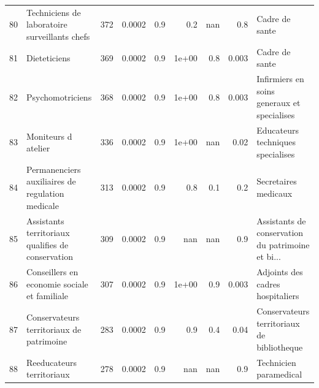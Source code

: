 \documentclass[11pt,a4paper]{article}
\begin{document}
\begin{tabular}{llrrrrrrl}
	80  &      Techniciens de laboratoire surveillants chefs &            372 &         0.0002 &                    0.9 &                0.2 &                               nan &                                      0.8 &                                     Cadre de sante \\
	81  &                                       Dieteticiens &            369 &         0.0002 &                    0.9 &              1e+00 &                               0.8 &                                    0.003 &                                     Cadre de sante \\
	82  &                                   Psychomotriciens &            368 &         0.0002 &                    0.9 &              1e+00 &                               0.8 &                                    0.003 &        Infirmiers en soins generaux et specialises \\
	83  &                                Moniteurs d atelier &            336 &         0.0002 &                    0.9 &              1e+00 &                               nan &                                     0.02 &                  Educateurs techniques specialises \\
	84  &   Permanenciers auxiliaires de regulation medicale &            313 &         0.0002 &                    0.9 &                0.8 &                               0.1 &                                      0.2 &                               Secretaires medicaux \\
	85  &  Assistants territoriaux qualifies de conservation &            309 &         0.0002 &                    0.9 &                nan &                               nan &                                      0.9 &  Assistants de conservation du patrimoine et bi... \\
	86  &       Conseillers en economie sociale et familiale &            307 &         0.0002 &                    0.9 &              1e+00 &                               0.9 &                                    0.003 &                   Adjoints des cadres hospitaliers \\
	87  &           Conservateurs territoriaux de patrimoine &            283 &         0.0002 &                    0.9 &                0.9 &                               0.4 &                                     0.04 &         Conservateurs territoriaux de bibliotheque \\
	88  &                          Reeducateurs territoriaux &            278 &         0.0002 &                    0.9 &                nan &                               nan &                                      0.9 &                             Technicien paramedical \\

\end{tabular}
\end{document}
